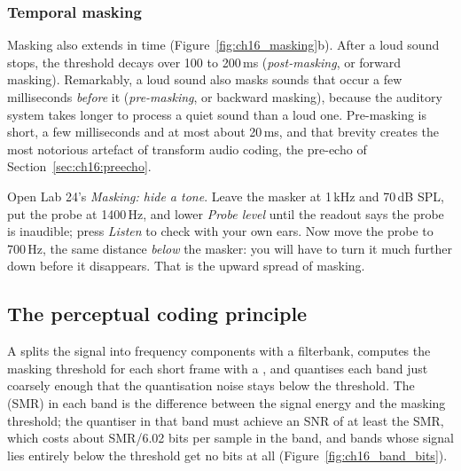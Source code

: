 \subsubsection{Temporal masking}

Masking also extends in time (Figure~\ref{fig:ch16_masking}b). After a loud sound stops, the threshold
decays over 100 to 200\,ms (\emph{post-masking}, or forward masking). Remarkably, a loud sound also
masks sounds that occur a few milliseconds \emph{before} it (\emph{pre-masking}, or backward masking),
because the auditory system takes longer to process a quiet sound than a loud one. Pre-masking is
short, a few milliseconds and at most about 20\,ms, and that brevity creates the most notorious artefact
of transform audio coding, the pre-echo of Section~\ref{sec:ch16:preecho}.


\begin{tryit}
Open Lab 24's \emph{Masking: hide a tone}. Leave the masker at 1\,kHz and 70\,dB SPL, put the
probe at 1400\,Hz, and lower \emph{Probe level} until the readout says the probe is inaudible;
press \emph{Listen} to check with your own ears. Now move the probe to 700\,Hz, the same distance
\emph{below} the masker: you will have to turn it much further down before it disappears. That is
the upward spread of masking.
\end{tryit}

\subsection{The perceptual coding principle}

A  splits the signal into frequency components with a filterbank,
computes the masking threshold for each short frame with a , and
quantises each band just coarsely enough that the quantisation noise stays below the threshold.
The  (SMR) in each band is the difference between the signal energy and the
masking threshold; the quantiser in that band must achieve an SNR of at least the SMR, which costs about
SMR/6.02 bits per sample in the band, and bands whose signal lies entirely below the threshold get
no bits at all (Figure~\ref{fig:ch16_band_bits}).

